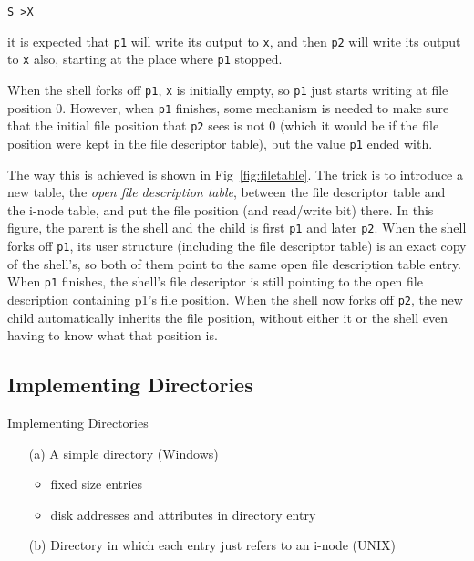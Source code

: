\begin{description}
  \texttt{S >X}

  it is expected that \texttt{p1} will write its output to \texttt{x}, and then
  \texttt{p2} will write its output to \texttt{x} also, starting at the place where
  \texttt{p1} stopped.

  When the shell forks off \texttt{p1}, \texttt{x} is initially empty, so \texttt{p1} just
  starts writing at file position 0. However, when \texttt{p1} finishes, some mechanism is
  needed to make sure that the initial file position that \texttt{p2} sees is not 0 (which
  it would be if the file position were kept in the file descriptor table), but the value
  \texttt{p1} ended with.

  The way this is achieved is shown in Fig~\ref{fig:filetable}. The trick is to introduce
  a new table, the \emph{open file description table}, between the file descriptor table
  and the i-node table, and put the file position (and read/write bit) there. In this
  figure, the parent is the shell and the child is first \texttt{p1} and later
  \texttt{p2}. When the shell forks off \texttt{p1}, its user structure (including the
  file descriptor table) is an exact copy of the shell's, so both of them point to the
  same open file description table entry. When \texttt{p1} finishes, the shell's file
  descriptor is still pointing to the open file description containing p1's file
  position. When the shell now forks off \texttt{p2}, the new child automatically inherits
  the file position, without either it or the shell even having to know what that position
  is.
\end{description}

\subsection{Implementing Directories}

\begin{frame}{Implementing Directories}
  \begin{center}\label{fig:dir}
    \mode<beamer>{ \texttt{[image: mos-figs-6-16]} }%
  \end{center}
  \begin{itemize}
  \item[(a)] A simple directory (Windows)
    \begin{itemize}
    \item fixed size entries
    \item disk addresses and attributes in directory entry
    \end{itemize}
  \item[(b)] Directory in which each entry just refers to an i-node (UNIX)
  \end{itemize}
\end{frame}

